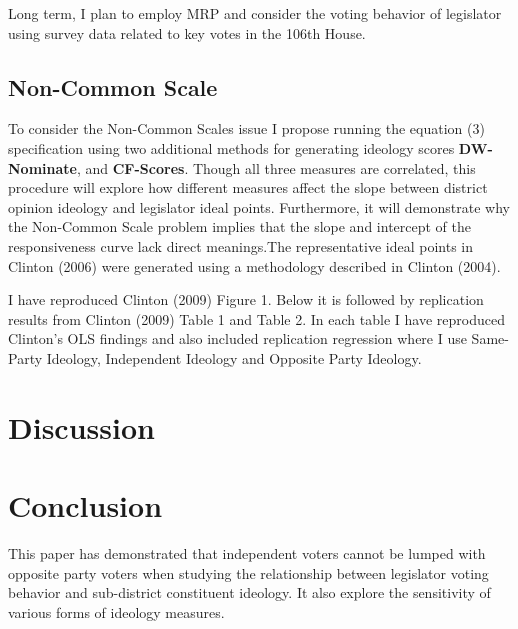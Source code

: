 \documentclass[10pt,letterpaper]{article}
\begin{document}
Long term, I plan to employ MRP and consider the voting behavior of legislator using survey data related to key votes in the 106th House.

\newpage




 

% 


\newpage


\subsection{Non-Common Scale}
To consider the Non-Common Scales issue I propose running the equation (3) specification using two additional methods for generating ideology scores \textbf{DW-Nominate}, and \textbf{CF-Scores}. Though all three measures are correlated, this procedure will explore how different measures affect the slope between district opinion ideology and legislator ideal points. Furthermore, it will demonstrate why the Non-Common Scale problem implies that the slope and intercept of the responsiveness curve lack direct meanings.The representative ideal points in Clinton (2006) were generated using a methodology described in Clinton (2004).


I have reproduced Clinton (2009) Figure 1. Below it is followed by replication results from Clinton (2009) Table 1 and Table 2. In each table I have reproduced Clinton's OLS findings and also included replication regression where I use Same-Party Ideology, Independent Ideology and Opposite Party Ideology.





\section{Discussion} 







\newpage
%

\newpage


\newpage

\newpage


\section{Conclusion} 
This paper has demonstrated that independent voters cannot be lumped with opposite party voters when studying the relationship between legislator voting behavior and sub-district constituent ideology. It also explore the sensitivity of various forms of ideology measures.
\end{document}
